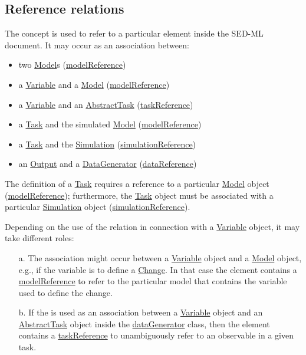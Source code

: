 \subsection{Reference relations}
\label{sec:reference}

The  concept is used to refer to a particular element inside the SED-ML document. It may occur as an association between:

\begin{itemize}
	\item{two \hyperref[class:model]{Model}s (\hyperref[sec:modelReference]{modelReference})}
	\item{a \hyperref[class:variable]{Variable} and a \hyperref[class:model]{Model} (\hyperref[sec:modelReference]{modelReference})}
	\item{a \hyperref[class:variable]{Variable} and an \hyperref[class:abstractTask]{AbstractTask} (\hyperref[sec:taskReference]{taskReference})}
	\item{a \hyperref[class:task]{Task} and the simulated \hyperref[class:model]{Model} (\hyperref[sec:modelReference]{modelReference})}
	\item{a \hyperref[class:task]{Task} and the \hyperref[class:simulation]{Simulation} (\hyperref[sec:simulationReference]{simulationReference})}
	\item{an \hyperref[class:output]{Output} and a \hyperref[class:dataGenerator]{DataGenerator} (\hyperref[sec:dataReference]{dataReference})}
\end{itemize}

The definition of a \hyperref[class:task]{Task} requires a reference to a particular \hyperref[class:model]{Model} object (\hyperref[sec:modelReference]{modelReference}); furthermore, the \hyperref[class:abstractTask]{Task} object must be associated with a particular \hyperref[class:simulation]{Simulation} object (\hyperref[sec:simulationReference]{simulationReference}).

Depending on the use of the  relation in connection with a \hyperref[class:variable]{Variable} object, it may take different roles: 

\begin{enumerate}
\item[a.]{The  association might occur between a \hyperref[class:variable]{Variable} object and a \hyperref[class:model]{Model} object, e.g., if the variable is to define a \hyperref[class:change]{Change}. 
In that case the  element contains a \hyperref[sec:modelReference]{modelReference} to refer to the particular model that contains the variable used to define the change.}

\item[b.]{If the  is used as an association between a \hyperref[class:variable]{Variable} object and an \hyperref[class:abstractTask]{AbstractTask} object inside the \hyperref[class:dataGenerator]{dataGenerator} class, then the  element contains a \hyperref[sec:taskReference]{taskReference} to unambiguously refer to an observable in a given task.}
\end{enumerate}



